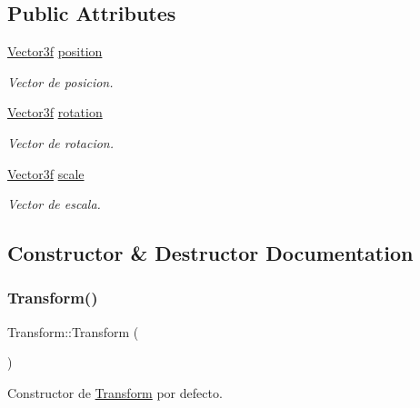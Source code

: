 \subsection*{Public Attributes}
\begin{DoxyCompactItemize}
\item 
\mbox{\hyperlink{structmathexp_1_1_vector3f}{Vector3f}} \mbox{\hyperlink{class_transform_a93e0de362a87f0b687f1cd90a2c144ba}{position}}
\begin{DoxyCompactList}\small\item\em Vector de posicion. \end{DoxyCompactList}\item 
\mbox{\hyperlink{structmathexp_1_1_vector3f}{Vector3f}} \mbox{\hyperlink{class_transform_ad8ef4617a93b1e5959cda74122ded7e5}{rotation}}
\begin{DoxyCompactList}\small\item\em Vector de rotacion. \end{DoxyCompactList}\item 
\mbox{\hyperlink{structmathexp_1_1_vector3f}{Vector3f}} \mbox{\hyperlink{class_transform_a3393425f0ba702b4a31d978f2118fe37}{scale}}
\begin{DoxyCompactList}\small\item\em Vector de escala. \end{DoxyCompactList}\end{DoxyCompactItemize}


\subsection{Constructor \& Destructor Documentation}
\mbox{\label{class_transform_a144ce8dcafd13ca66acb5a1636cfc297}} 
\subsubsection{\texorpdfstring{Transform()}{Transform()}\hspace{0.1cm}{\footnotesize\ttfamily [1/2]}}
{\footnotesize\ttfamily Transform\+::\+Transform (\begin{DoxyParamCaption}{ }\end{DoxyParamCaption})\hspace{0.3cm}{\ttfamily [default]}}



Constructor de \mbox{\hyperlink{class_transform}{Transform}} por defecto. 


